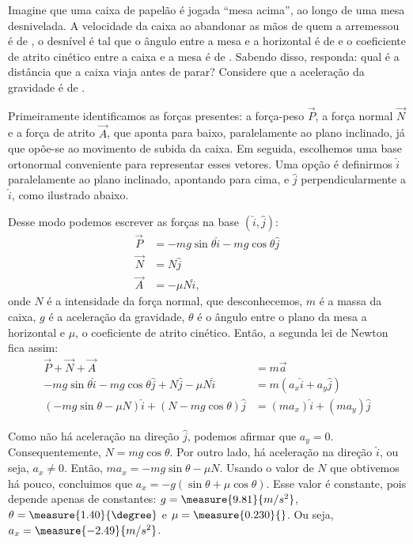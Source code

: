 \begin{question}
	Imagine que uma caixa de papelão é jogada ``mesa acima'', ao longo de uma mesa desnivelada.
	A velocidade da caixa ao abandonar as mãos de quem a arremessou é de , o desnível é tal que o ângulo entre a mesa e a horizontal é de  e o coeficiente de atrito cinético entre a caixa e a mesa é de .
	Sabendo disso, responda: qual é a distância que a caixa viaja antes de parar?
	Considere que a aceleração da gravidade é de .

	\begin{answer}
	\end{answer}

	\begin{solution}
		Primeiramente identificamos as forças presentes: a força-peso $\vec P$, a força normal $\vec N$ e a força de atrito $\vec A$, que aponta para baixo, paralelamente ao plano inclinado, já que opõe-se ao movimento de subida da caixa.
		Em seguida, escolhemos uma base ortonormal conveniente para representar esses vetores.
		Uma opção é definirmos $\hat i$ paralelamente ao plano inclinado, apontando para cima, e $\hat j$ perpendicularmente a $\hat i$, como ilustrado abaixo.


		Desse modo podemos escrever as forças na base $(\hat i, \hat j)$:
		\begin{align*}
			\vec P &= -mg\sin\theta\hat i - mg\cos\theta\hat j \\
			\vec N &= N\hat j \\
			\vec A &= -\mu N \hat i,
		\end{align*}
		onde $N$ é a intensidade da força normal, que desconhecemos, $m$ é a massa da caixa, $g$ é a aceleração da gravidade, $\theta$ é o ângulo entre o plano da mesa a horizontal e $\mu$, o coeficiente de atrito cinético.
		Então, a segunda lei de Newton fica assim:
		\begin{align*}
			\vec P + \vec N + \vec A &= m \vec a \\
			-mg\sin\theta\hat i - mg\cos\theta\hat j + N\hat j -\mu N \hat i &= m (a_x \hat i + a_y \hat j) \\
			(-mg\sin\theta - \mu N) \hat i + (N  - mg\cos\theta)\hat j &= (m a_x)\hat i + (m a_y) \hat j
		\end{align*}

		Como não há aceleração na direção $\hat j$, podemos afirmar que $a_y = 0$.
		Consequentemente, $N = mg\cos\theta$.
		Por outro lado, há aceleração na direção $\hat i$, ou seja, $a_x \ne 0$.
		Então, $ma_x = -mg\sin\theta - \mu N$.
		Usando o valor de $N$ que obtivemos há pouco, concluimos que $a_x = -g(\sin\theta + \mu \cos\theta)$.
		Esse valor é constante, pois depende apenas de constantes: $g = \measure{9.81}{m/s^2}$, $\theta = \measure{1.40}{\degree}$ e $\mu = \measure{0.230}{}$.
		Ou seja, $a_x = \measure{-2.49}{m/s^2}$.


\end{solution}
\end{question}
